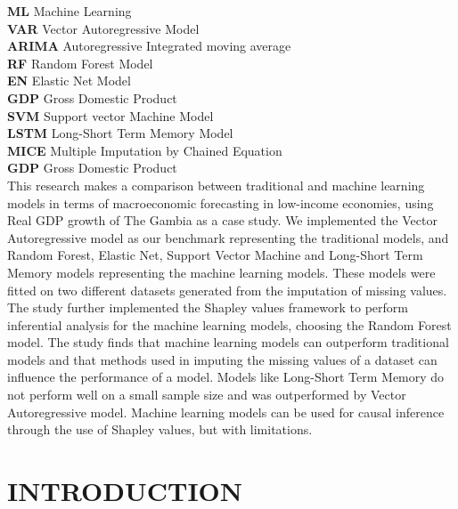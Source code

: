 \documentclass[12pt,italian, twoside]{report}
\begin{document}
\textbf{ML} Machine Learning
\\
\textbf{VAR} Vector Autoregressive Model\\
\textbf{ARIMA}  Autoregressive Integrated moving average\\
\textbf{RF} Random Forest Model
\\
\textbf{EN} Elastic Net Model
\\
\textbf{GDP} Gross Domestic Product\\
\textbf{SVM} Support vector Machine Model\\
\textbf{LSTM} Long-Short Term Memory Model\\
\textbf{MICE} Multiple Imputation by Chained Equation\\
\textbf{GDP} Gross Domestic Product
\\


This research makes a comparison between traditional and machine learning models in terms of macroeconomic forecasting in low-income economies, using Real GDP growth of The Gambia as a case study. We implemented the Vector Autoregressive model as our benchmark representing the traditional models, and Random Forest, Elastic Net, Support Vector Machine and Long-Short Term Memory models representing the machine learning models. These models were fitted on two different datasets generated from the imputation of missing values. The study further implemented the Shapley values framework to perform inferential analysis for the machine learning models, choosing the Random Forest model. The study finds that machine learning models can outperform traditional models and that methods used in imputing the missing values of a dataset can influence the performance of a model. Models like Long-Short Term Memory do not perform well on a small sample size and was outperformed by Vector Autoregressive model. Machine learning models can be used for causal inference through the use of Shapley values, but with limitations. 



%
%

\afterpreface
% 
% 

\chapter{INTRODUCTION}
\label{cap:introduction}
\end{document}

